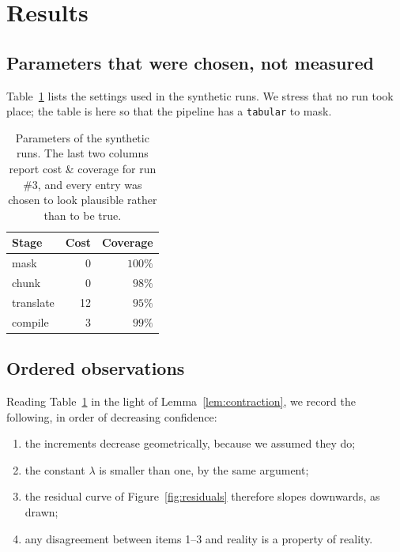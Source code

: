 \section{Results}
\label{sec:results}

\subsection{Parameters that were chosen, not measured}
\label{sec:params}

Table~\ref{tab:params} lists the settings used in the synthetic runs.  We stress
that no run took place; the table is here so that the pipeline has a
\texttt{tabular} to mask.

\begin{table}[t]
  \centering
  \caption[Synthetic parameters]{Parameters of the synthetic runs.  The last two
  columns report cost \& coverage for run \#3, and every entry was chosen to
  look plausible rather than to be true.}
  \label{tab:params}
  \begin{tabular}{lrr}
    \hline
    Stage     & Cost & Coverage \\
    \hline
    mask      & 0    & $100\%$   \\
    chunk     & 0    & $98\%$    \\
    translate & 12   & $95\%$    \\
    compile   & 3    & $99\%$    \\
    \hline
  \end{tabular}
\end{table}

\subsection{Ordered observations}
\label{sec:observations}

Reading Table~\ref{tab:params} in the light of Lemma~\ref{lem:contraction}, we
record the following, in order of decreasing confidence:

\begin{enumerate}
  \item the increments decrease geometrically, because we assumed they do;
  \item the constant $\lambda$ is smaller than one, by the same argument;
  \item the residual curve of Figure~\ref{fig:residuals} therefore slopes
        downwards, as drawn;
  \item any disagreement between items 1--3 and reality is a property of
        reality.
\end{enumerate}


